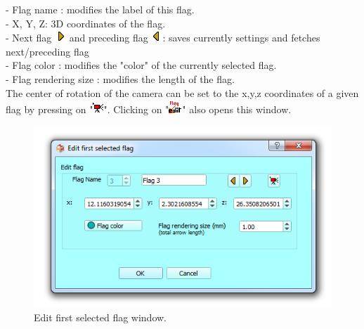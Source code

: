 - Flag name : modifies the label of this flag.\\
- X, Y, Z: 3D coordinates of the flag.\\
- Next flag \includegraphics[scale=0.7]{images/10/s_right.png} and preceding flag \includegraphics[scale=0.7]{images/10/s_left.png}: saves currently  settings and fetches next/preceding flag\\
- Flag color : modifies the "color" of the currently selected flag.\\
- Flag rendering size : modifies the length of the flag.\\
The center of rotation of the camera can be set to the x,y,z coordinates of a given flag by pressing on "\includegraphics[scale=0.7]{images/06/objects/move_cam3.png}".
Clicking on "\includegraphics[scale=0.7]{images/06/objects/flag_edit.png}" also opens this window.

\begin{figure}
  \centering
  \includegraphics[scale=0.55]{images/10/edit_flag.png} 
	\caption{Edit first selected flag window.}	
\end{figure}
\label{flag_edit}
 


